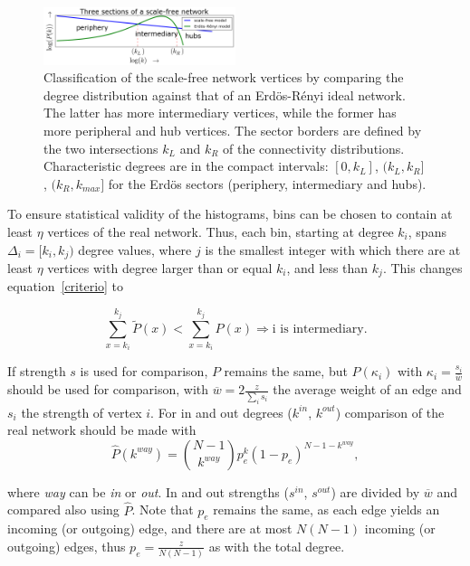 \documentclass[%
	aip,
	jmp,%
	amsmath,amssymb,
	reprint,%
]{revtex4-1}
\begin{document}
\begin{figure}[!h]
	\centering
	\includegraphics[width=0.5\textwidth]{figs/fser_}
	\caption{Classification of the scale-free network vertices by comparing the degree
		distribution against that of an Erd\"os-R\'enyi ideal network.
		The latter has more intermediary vertices, while the former has more peripheral and hub vertices.
		The sector borders are defined by the two intersections $k_L$ and $k_R$ of the connectivity distributions.
		Characteristic degrees are in the compact intervals: $[0,k_L]$, $(k_L,k_R]$, $(k_R,k_{max}]$ for the Erd\"os sectors (periphery, intermediary and hubs).}
		\label{fig:setores}
\end{figure}
To ensure statistical validity of the histograms, bins can be chosen to contain at least $\eta$ vertices of the real network. Thus, each bin, starting at degree $k_i$, spans $\Delta_i=[k_{i},k_{j})$ degree values, where $j$ is the smallest integer with which there are at least $\eta$ vertices with degree larger than or equal $k_i$, and less than $k_{j}$. This changes equation~\ref{criterio} to

\begin{equation}\label{criterio2}
	\sum_{x=k_i}^{k_j} \widetilde{P}(x) < \sum_{x=k_i}^{k_j} P(x) \Rightarrow \text{i is intermediary.}
\end{equation}

If strength $s$ is used for comparison, $P$ remains the same, but $P(\kappa_i)$ with $\kappa_i=\frac{s_i}{\overline{w}}$ should be used for comparison, with $\overline{w}=2\frac{z}{\sum_is_i}$ the average weight of an edge and $s_i$ the strength of vertex $i$. For in and out degrees ($k^{in}$, $k^{out}$) comparison of the real network should be made with
\begin{equation}
	\hat{P}(k^{way})=\binom{N-1}{k^{way}}p_e^k(1-p_e)^{N-1-k^{way}},
\end{equation}

\noindent where \emph{way} can be \emph{in} or \emph{out}. In and out strengths ($s^{in}$, $s^{out}$) are divided by $\overline{w}$ and compared also using $\hat{P}$. Note that $p_e$ remains the same, as each edge yields an incoming (or outgoing) edge, and there are at most $N(N-1)$ incoming (or outgoing) edges, thus $p_e=\frac{z}{N(N-1)}$ as with the total degree.
\end{document}
